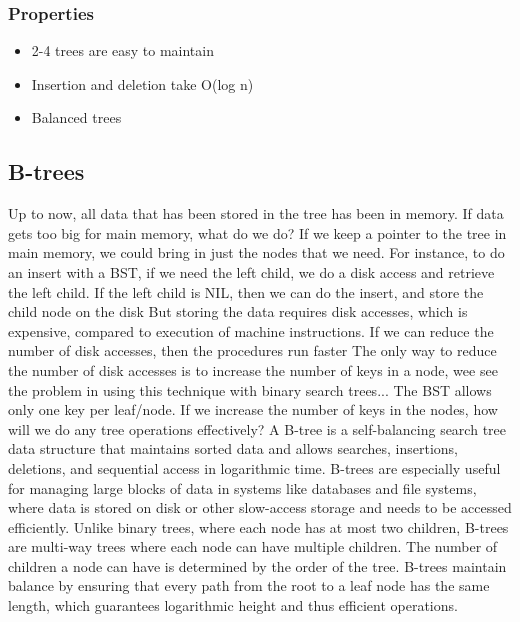 \documentclass{report}
\begin{document}
\bigbreak \noindent 
\subsubsection{Properties}
\bigbreak \noindent 
\begin{itemize}
    \item 2-4 trees are easy to maintain
    \item Insertion and deletion take O(log n)
    \item Balanced trees
\end{itemize}
%
\pagebreak 
\subsection{B-trees}
\bigbreak \noindent 
Up to now, all data that has been stored in the tree has been in memory. If data gets too big for main memory, what do we do? If we keep a pointer to the tree in main memory, we could bring in just the nodes that we need.
\bigbreak \noindent 
For instance, to do an insert with a BST, if we need the left child, we do a disk access and retrieve the left child. If the left child is NIL, then we can do the insert, and store the child node on the disk
\bigbreak \noindent 
But storing the data requires disk accesses, which is expensive, compared to execution of machine instructions. If we can reduce the number of disk accesses, then the procedures run faster
\bigbreak \noindent 
The only way to reduce the number of disk accesses is to increase the number of keys in a node, wee see the problem in using this technique with binary search trees... The BST allows only one key per leaf/node.
\bigbreak \noindent 
If we increase the number of keys in the nodes, how will we do any tree operations effectively?
\bigbreak \noindent 
A B-tree is a self-balancing search tree data structure that maintains sorted data and allows searches, insertions, deletions, and sequential access in logarithmic time. B-trees are especially useful for managing large blocks of data in systems like databases and file systems, where data is stored on disk or other slow-access storage and needs to be accessed efficiently.
\bigbreak \noindent 
Unlike binary trees, where each node has at most two children, B-trees are multi-way trees where each node can have multiple children. The number of children a node can have is determined by the order of the tree.
\bigbreak \noindent 
 B-trees maintain balance by ensuring that every path from the root to a leaf node has the same length, which guarantees logarithmic height and thus efficient operations.
\end{document}
